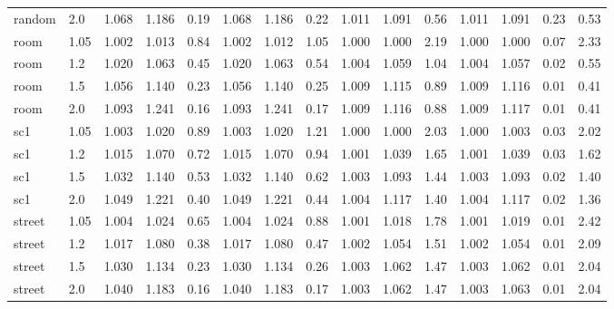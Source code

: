 \begin{tabular}{ll rrr rrr rrr rrrr}
random & 2.0 & 1.068 & 1.186 & 0.19 & 1.068 & 1.186 & 0.22 & 1.011 & 1.091 & 0.56 & 1.011 & 1.091 & 0.23 & 0.53\\
room & 1.05 & 1.002 & 1.013 & 0.84 & 1.002 & 1.012 & 1.05 & 1.000 & 1.000 & 2.19 & 1.000 & 1.000 & 0.07 & 2.33\\
room & 1.2 & 1.020 & 1.063 & 0.45 & 1.020 & 1.063 & 0.54 & 1.004 & 1.059 & 1.04 & 1.004 & 1.057 & 0.02 & 0.55\\
room & 1.5 & 1.056 & 1.140 & 0.23 & 1.056 & 1.140 & 0.25 & 1.009 & 1.115 & 0.89 & 1.009 & 1.116 & 0.01 & 0.41\\
room & 2.0 & 1.093 & 1.241 & 0.16 & 1.093 & 1.241 & 0.17 & 1.009 & 1.116 & 0.88 & 1.009 & 1.117 & 0.01 & 0.41\\
sc1 & 1.05 & 1.003 & 1.020 & 0.89 & 1.003 & 1.020 & 1.21 & 1.000 & 1.000 & 2.03 & 1.000 & 1.003 & 0.03 & 2.02\\
sc1 & 1.2 & 1.015 & 1.070 & 0.72 & 1.015 & 1.070 & 0.94 & 1.001 & 1.039 & 1.65 & 1.001 & 1.039 & 0.03 & 1.62\\
sc1 & 1.5 & 1.032 & 1.140 & 0.53 & 1.032 & 1.140 & 0.62 & 1.003 & 1.093 & 1.44 & 1.003 & 1.093 & 0.02 & 1.40\\
sc1 & 2.0 & 1.049 & 1.221 & 0.40 & 1.049 & 1.221 & 0.44 & 1.004 & 1.117 & 1.40 & 1.004 & 1.117 & 0.02 & 1.36\\
street & 1.05 & 1.004 & 1.024 & 0.65 & 1.004 & 1.024 & 0.88 & 1.001 & 1.018 & 1.78 & 1.001 & 1.019 & 0.01 & 2.42\\
street & 1.2 & 1.017 & 1.080 & 0.38 & 1.017 & 1.080 & 0.47 & 1.002 & 1.054 & 1.51 & 1.002 & 1.054 & 0.01 & 2.09\\
street & 1.5 & 1.030 & 1.134 & 0.23 & 1.030 & 1.134 & 0.26 & 1.003 & 1.062 & 1.47 & 1.003 & 1.062 & 0.01 & 2.04\\
street & 2.0 & 1.040 & 1.183 & 0.16 & 1.040 & 1.183 & 0.17 & 1.003 & 1.062 & 1.47 & 1.003 & 1.063 & 0.01 & 2.04\\
\bottomrule\end{tabular}
